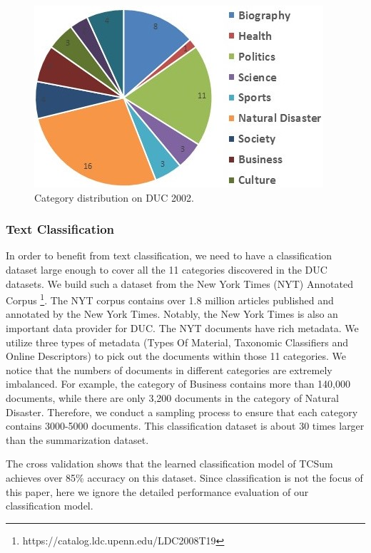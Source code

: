 \documentclass[letterpaper]{article}
\begin{document}
\begin{figure}
\centering
\includegraphics[width=0.7\linewidth]{CategoryNumber}
\caption{Category distribution on DUC 2002.}
\label{fig:category}
\end{figure}


\subsubsection{Text Classification}
In order to benefit from text classification, we need to have a classification dataset large enough to cover all the 11 categories discovered in the DUC datasets.
We build such a dataset from the New York Times (NYT) Annotated Corpus \footnote{https://catalog.ldc.upenn.edu/LDC2008T19}.
The NYT corpus contains over 1.8 million articles published and annotated by the New York Times.
Notably, the New York Times is also an important data provider for DUC.
The NYT documents have rich metadata.
We utilize three types of metadata (Types Of Material, Taxonomic Classifiers and Online Descriptors) to pick out the documents within those 11 categories.
We notice that the numbers of documents in different categories are extremely imbalanced.
For example, the category of Business contains more than 140,000 documents, while there are only 3,200 documents in the category of Natural Disaster.
Therefore, we conduct a sampling process to ensure that each category contains 3000-5000 documents.
This classification dataset is about 30 times larger than the summarization dataset.

The cross validation shows that the learned classification model of TCSum achieves over 85\% accuracy on this dataset.
Since classification is not the focus of this paper, here we ignore the detailed performance evaluation of our classification model.
\end{document}
